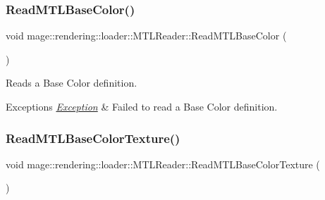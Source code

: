 \hypertarget{classmage_1_1rendering_1_1loader_1_1_m_t_l_reader_ae228231b40bc5b8a6fdff3a9a5698530}{}\label{classmage_1_1rendering_1_1loader_1_1_m_t_l_reader_ae228231b40bc5b8a6fdff3a9a5698530} 
\subsubsection{\texorpdfstring{Read\+M\+T\+L\+Base\+Color()}{ReadMTLBaseColor()}}
{\footnotesize\ttfamily void mage\+::rendering\+::loader\+::\+M\+T\+L\+Reader\+::\+Read\+M\+T\+L\+Base\+Color (\begin{DoxyParamCaption}{ }\end{DoxyParamCaption})\hspace{0.3cm}{\ttfamily [private]}}

Reads a Base Color definition.


\begin{DoxyExceptions}{Exceptions}
{\em \hyperlink{classmage_1_1_exception}{Exception}} & Failed to read a Base Color definition. \\
\hline
\end{DoxyExceptions}
\hypertarget{classmage_1_1rendering_1_1loader_1_1_m_t_l_reader_a67198ee5158ee7d77e907f6538030aee}{}\label{classmage_1_1rendering_1_1loader_1_1_m_t_l_reader_a67198ee5158ee7d77e907f6538030aee} 
\subsubsection{\texorpdfstring{Read\+M\+T\+L\+Base\+Color\+Texture()}{ReadMTLBaseColorTexture()}}
{\footnotesize\ttfamily void mage\+::rendering\+::loader\+::\+M\+T\+L\+Reader\+::\+Read\+M\+T\+L\+Base\+Color\+Texture (\begin{DoxyParamCaption}{ }\end{DoxyParamCaption})\hspace{0.3cm}{\ttfamily [private]}}

